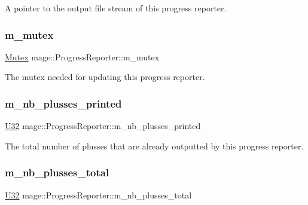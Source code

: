 A pointer to the output file stream of this progress reporter. \hypertarget{classmage_1_1_progress_reporter_a32a499aa1b8fccbc8393fe32305dfeb1}{}\label{classmage_1_1_progress_reporter_a32a499aa1b8fccbc8393fe32305dfeb1} 
\subsubsection{\texorpdfstring{m\+\_\+mutex}{m\_mutex}}
{\footnotesize\ttfamily \hyperlink{structmage_1_1_mutex}{Mutex} mage\+::\+Progress\+Reporter\+::m\+\_\+mutex\hspace{0.3cm}{\ttfamily [private]}}

The mutex needed for updating this progress reporter. \hypertarget{classmage_1_1_progress_reporter_a0279302ea777f9db2735fff1a8ae2d26}{}\label{classmage_1_1_progress_reporter_a0279302ea777f9db2735fff1a8ae2d26} 
\subsubsection{\texorpdfstring{m\+\_\+nb\+\_\+plusses\+\_\+printed}{m\_nb\_plusses\_printed}}
{\footnotesize\ttfamily \hyperlink{namespacemage_a41c104c036fba3756a74e19f793eeaa1}{U32} mage\+::\+Progress\+Reporter\+::m\+\_\+nb\+\_\+plusses\+\_\+printed\hspace{0.3cm}{\ttfamily [private]}}

The total number of plusses that are already outputted by this progress reporter. \hypertarget{classmage_1_1_progress_reporter_a9afda919e0fa57c8aa7a6667385318c9}{}\label{classmage_1_1_progress_reporter_a9afda919e0fa57c8aa7a6667385318c9} 
\subsubsection{\texorpdfstring{m\+\_\+nb\+\_\+plusses\+\_\+total}{m\_nb\_plusses\_total}}
{\footnotesize\ttfamily \hyperlink{namespacemage_a41c104c036fba3756a74e19f793eeaa1}{U32} mage\+::\+Progress\+Reporter\+::m\+\_\+nb\+\_\+plusses\+\_\+total\hspace{0.3cm}{\ttfamily [private]}}

